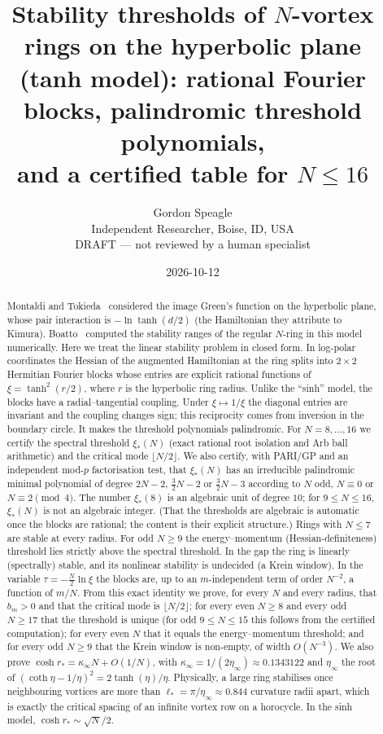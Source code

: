 \documentclass[11pt]{article}
\title{Stability thresholds of $N$-vortex rings on the hyperbolic plane\\
(tanh model): rational Fourier blocks, palindromic threshold polynomials,\\
and a certified table for $N\le16$}
\author{Gordon Speagle\\Independent Researcher, Boise, ID, USA\\[2pt]\small DRAFT --- not reviewed by a human specialist}
\date{2026-10-12}
\theoremstyle{remark}
\begin{document}
\maketitle

\begin{abstract}
Montaldi and Tokieda~\cite[\S4.2]{MT} considered the image Green's function on the hyperbolic plane, whose pair
interaction is $-\ln\tanh(d/2)$ (the Hamiltonian they attribute to Kimura). Boatto~\cite{Boatto} computed the
stability ranges of the regular $N$-ring in this model numerically. Here we treat the linear stability problem in
closed form. In log-polar coordinates the Hessian
of the augmented Hamiltonian at the ring splits into $2\times2$ Hermitian Fourier blocks whose entries are explicit
rational functions of $\xi=\tanh^2(r/2)$, where $r$ is the hyperbolic ring radius. Unlike the ``sinh'' model, the blocks
have a radial--tangential coupling. Under $\xi\mapsto1/\xi$ the diagonal entries are invariant and the coupling
changes sign; this reciprocity comes from inversion in the boundary circle. It makes the threshold polynomials
palindromic. For $N=8,\dots,16$ we certify the spectral threshold $\xi_*(N)$ (exact rational root isolation and Arb
ball arithmetic) and the critical mode $\lfloor N/2\rfloor$. We also certify, with PARI/GP and an independent
mod-$p$ factorisation test, that $\xi_*(N)$ has an irreducible palindromic minimal polynomial of degree $2N-2$,
$\frac32N-2$ or $\frac32N-3$ according to $N$ odd, $N\equiv0$ or $N\equiv2\pmod 4$. The number $\xi_*(8)$ is an algebraic
unit of degree $10$; for $9\le N\le16$, $\xi_*(N)$ is not an algebraic integer. (That the thresholds are algebraic is
automatic once the blocks are rational; the content is their explicit structure.) Rings with $N\le7$ are stable at
every radius. For odd $N\ge9$ the energy--momentum (Hessian-definiteness) threshold lies strictly above the spectral
threshold. In the gap the ring is linearly (spectrally) stable, and its nonlinear stability is undecided (a Krein
window). In the variable $\tau=-\frac N2\ln\xi$ the blocks are, up to an $m$-independent term of order $N^{-2}$, a
function of $m/N$. From this exact identity we prove, for every $N$ and every radius, that $b_m>0$ and that the critical
mode is $\lfloor N/2\rfloor$; for every even $N\ge8$ and every odd $N\ge17$ that the threshold is unique (for odd
$9\le N\le15$ this follows from the certified computation); for every even $N$ that it equals the
energy--momentum threshold; and for every odd $N\ge9$ that the Krein window is non-empty, of width $O(N^{-3})$. We also prove
$\cosh r_*=\kappa_\infty N+O(1/N)$, with $\kappa_\infty=1/(2\eta_\infty)\approx0.1343122$ and $\eta_\infty$ the root of
$(\coth\eta-1/\eta)^2=2\tanh(\eta)/\eta$. Physically, a large ring stabilises once neighbouring vortices are more than
$\ell_*=\pi/\eta_\infty\approx0.844$ curvature radii apart, which is exactly the critical spacing of an infinite vortex row
on a horocycle. In
the sinh model, $\cosh r_*\sim\sqrt N/2$.
\end{abstract}
\end{document}
